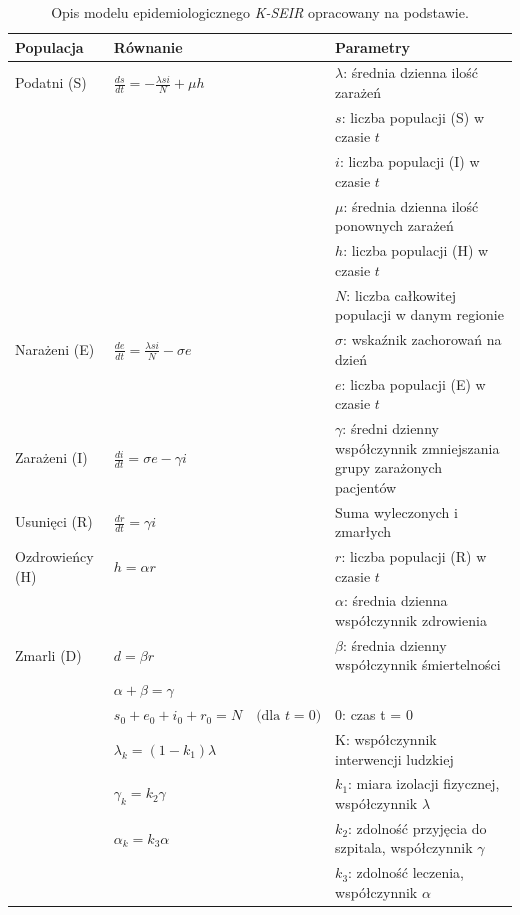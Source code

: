 \begin{table}[h!]

	\centering
	\caption{Opis modelu epidemiologicznego \textit {K-SEIR} opracowany na podstawie\cite{bib:artykul}. }
	\label{tab:model_epidemiologiczny}
	\begin{tabular}{|p{3cm}|p{7cm}|p{5cm}|}
		\hline
		\textbf{Populacja} & \textbf{Równanie} & \textbf{Parametry} \\
		\hline
		Podatni (S) & $\frac{ds}{dt} = -\frac{\lambda si}{N} + \mu h$ & $\lambda$: średnia dzienna ilość zarażeń \\
		& & $s$: liczba populacji (S) w czasie $t$ \\
		& & $i$: liczba populacji (I) w czasie $t$ \\
		& & $\mu$: średnia dzienna ilość ponownych zarażeń \\
		& & $h$: liczba populacji (H) w czasie $t$ \\
		& & $N$: liczba całkowitej populacji w danym regionie \\
		\hline
		Narażeni (E) & $\frac{de}{dt} = \frac{\lambda si}{N} - \sigma e$ & $\sigma$: wskaźnik zachorowań na dzień \\
		& & $e$: liczba populacji (E) w czasie $t$ \\
		\hline
		Zarażeni (I) & $\frac{di}{dt} = \sigma e - \gamma i$ & $\gamma$: średni dzienny współczynnik zmniejszania grupy zarażonych pacjentów \\
		\hline
		Usunięci (R) & $\frac{dr}{dt} = \gamma i$ & Suma wyleczonych i zmarłych \\
		\hline
		Ozdrowieńcy (H) & $h = \alpha r$ & $r$: liczba populacji (R) w czasie $t$ \\
		& & $\alpha$: średnia dzienna współczynnik zdrowienia \\
		\hline
		Zmarli (D) & $d = \beta r$ & $\beta$: średnia dzienny współczynnik śmiertelności \\
		\cline{2-3}
		& $\alpha + \beta = \gamma$ & \\
		\cline{2-3}
		& $s_0 + e_0 + i_0 + r_0 = N \quad \text{(dla } t = 0)$ & 0: czas t = 0 \\
		\cline{2-3}
		& $\lambda_k = (1 - k_1) \lambda$ & K: współczynnik interwencji ludzkiej \\
		& $\gamma_k = k_2 \gamma$ & $k_1$: miara izolacji fizycznej, współczynnik $\lambda$ \\
		& $\alpha_k = k_3 \alpha$ & $k_2$: zdolność przyjęcia do szpitala, współczynnik $\gamma$ \\
								  & &	$k_3$: zdolność leczenia, współczynnik $\alpha$ \\
		\hline
	\end{tabular}
\end{table}

